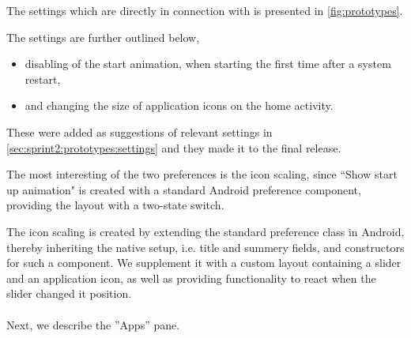 The settings which are directly in connection with \launcher is presented in \cref{fig:prototypes}.

The settings are further outlined below,
\begin{itemize}
 	\item disabling of the start animation, when starting \launcher the first time after a system restart,
 	\item and changing the size of application icons on the home activity.
\end{itemize} 
These were added as suggestions of relevant \launcher settings in \cref{sec:sprint2:prototypes:settings} and they made it to the final release.

The most interesting of the two preferences is the icon scaling, since ``Show start up animation" is created with a standard Android preference component, providing the layout with a two-state switch.

The icon scaling is created by extending the standard preference class in Android, thereby inheriting the native setup, i.e. title and summery fields, and constructors for such a component.
We supplement it with a custom layout containing a slider and an application icon, as well as providing functionality to react when the slider changed it position.\\\\
Next, we describe the ''Apps'' pane.